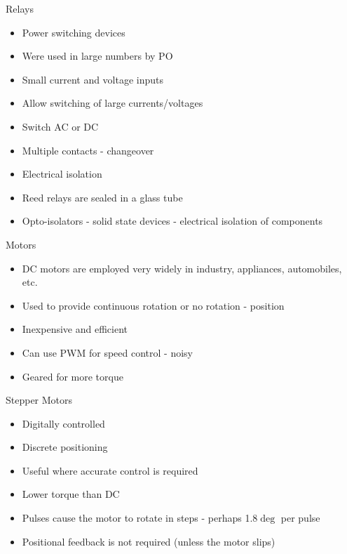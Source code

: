\documentclass[svgnames,x11names]{beamer}
\begin{document}
\begin{frame}{Relays}
\begin{itemize}
\item Power switching devices
\item Were used in large numbers by PO
\item Small current and voltage inputs
\item Allow switching of large currents/voltages
\item Switch AC or DC
\item Multiple contacts - changeover
\item Electrical isolation
\item Reed relays are sealed in a glass tube
\item Opto-isolators - solid state devices - electrical
isolation of components
\end{itemize}
\end{frame}

\begin{frame}{Motors}
\begin{itemize}
\item DC motors are employed very widely in
industry, appliances, automobiles, etc.
\item Used to provide continuous rotation or no
rotation - position
\item Inexpensive and efficient
\item Can use PWM for speed control - noisy
\item Geared for more torque
\end{itemize}
\end{frame}
\begin{frame}{Stepper Motors}
\begin{itemize}
\item Digitally controlled
\item Discrete positioning
\item Useful where accurate control is required
\item Lower torque than DC
\item Pulses cause the motor to rotate in steps -
perhaps 1.8$\deg$
 per pulse
\item Positional feedback is not required (unless
the motor slips)
\end{itemize}
\end{frame}
\end{document}
